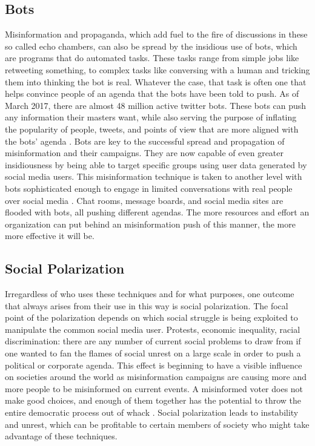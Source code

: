 \documentclass[sigconf]{acmart}
\begin{document}
\subsection{Bots}

Misinformation and propaganda, which add fuel to the fire of discussions in these so called echo chambers, can also be spread by the insidious use of bots, which are programs that do automated tasks. These tasks range from simple jobs like retweeting something, to complex tasks like conversing with a human and tricking them into thinking the bot is real. Whatever the case, that task is often one that helps convince people of an agenda that the bots have been told to push. As of March 2017, there are almost 48 million active twitter bots. These bots can push any information their masters want, while also serving the purpose of inflating the popularity of people, tweets, and points of view that are more aligned with the bots' agenda \cite{Budak2011}. Bots are key to the successful spread and propagation of misinformation and their campaigns. They are now capable of even greater insidiousness by being able to target specific groups using user data generated by social media users. This misinformation technique is taken to another level with bots sophisticated enough to engage in limited conversations with real people over social media \cite{Shao2017}. Chat rooms, message boards, and social media sites are flooded with bots, all pushing different agendas. The more resources and effort an organization can put behind an misinformation push of this manner, the more more effective it will be.

\subsection{Social Polarization}

Irregardless of who uses these techniques and for what purposes, one outcome that always arises from their use in this way is social polarization. The focal point of the polarization depends on which social struggle is being exploited to manipulate the common social media user. Protests, economic inequality, racial discrimination: there are any number of current social problems to draw from if one wanted to fan the flames of social unrest on a large scale in order to push a political or corporate agenda. This effect is beginning to have a visible influence on societies around the world as misinformation campaigns are causing more and more people to be misinformed on current events. A misinformed voter does not make good choices, and enough of them together has the potential to throw the entire democratic process out of whack \cite{Epstein2016}. Social polarization leads to instability and unrest, which can be profitable to certain members of society who might take advantage of these techniques. 
\end{document}
